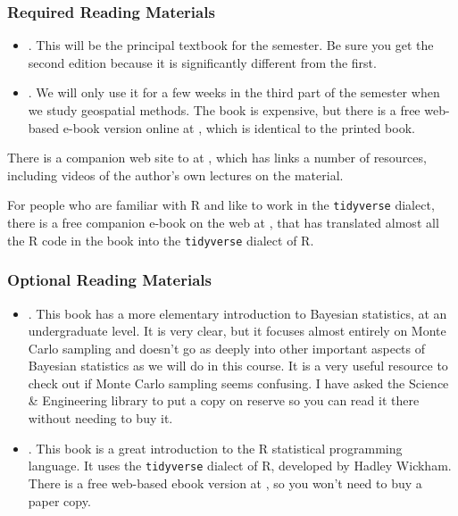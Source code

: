 \documentclass[11pt,twoside]{jgsyllabus}\usepackage[]{graphicx}\usepackage[]{xcolor}
\begin{document}
\subsubsection[Required Reading]{Required Reading Materials}
\begin{itemize}
	\item \LongRethinking. This will be the principal textbook for the semester.
	  Be sure you get the second edition because it is
	  significantly different from the first.
	\item \LongINLA. We will only use it for a few
	  weeks in the third part of the semester when we study geospatial methods.
	  The book is expensive, but there is a free web-based e-book version
	  online at \INLAURL, which is identical to the printed book.
\end{itemize}
There is a companion web site to \emph{\Rethinking\/} at \RethinkingWebSite,
which has links a number of resources, including videos of the author's own
lectures on the material.

For people who are familiar with R and like to work in the \texttt{tidyverse}
dialect, there is a free companion e-book on the web at \TidyRethinkingBook,
that has translated almost all the R code in the book into the \texttt{tidyverse}
dialect of R.

\subsubsection[Optional Books]{Optional Reading Materials}
\begin{itemize}
  \item \LongDBDA. This book has a more elementary introduction to Bayesian
    statistics, at an undergraduate level. It is very clear, but it
    focuses almost entirely on Monte Carlo sampling and doesn't go as deeply
    into other important aspects of Bayesian statistics as we will do in this
    course.
    It is a very useful resource to check out if Monte Carlo sampling seems
    confusing. I have asked the Science \& Engineering library to put a copy on
    reserve so you can read it there without needing to buy it.
  \item \LongWickham. This book is a great introduction to the R statistical
    programming language. It uses the \texttt{tidyverse} dialect of R,
    developed by Hadley Wickham.
    There is a free web-based ebook version at
    \WickhamURL, so you won't need to buy a paper copy.
\end{itemize}
\end{document}
